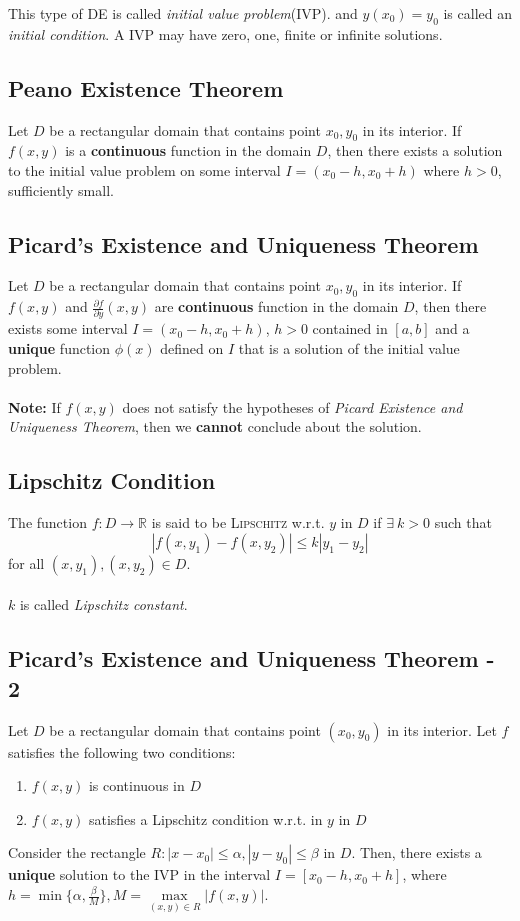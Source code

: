 \documentclass[oneside]{book}
\begin{document}
\noindent This type of DE is called \textit{initial value problem}(IVP). and \(y(x_0) = y_0\) is called an \textit{initial condition}.
A IVP may have zero, one, finite or infinite solutions.

\subsection{Peano Existence Theorem}
\noindent Let \(D\) be a rectangular domain that contains point \(x_0, y_0\) in its interior. If \(f(x, y)\) is a \textbf{continuous} function in the domain \(D\), then there exists a solution to the initial value problem on some interval \(I = (x_0 - h, x_0 + h)\) where \(h>0\), sufficiently small.

\subsection{Picard's Existence and Uniqueness Theorem}
\noindent Let \(D\) be a rectangular domain that contains point \(x_0, y_0\) in its interior. If \(f(x, y)\) and \(\frac{\partial f}{\partial y}(x, y)\) are \textbf{continuous} function in the domain \(D\), then there exists some interval \(I = (x_0 - h, x_0 + h)\), \(h>0\) contained in \([a, b]\) and a \textbf{unique} function \(\phi(x)\) defined on \(I\) that is a solution of the initial value problem.
\\\\
\noindent\textbf{Note:} If \(f(x, y)\) does not satisfy the hypotheses of \textit{Picard Existence and Uniqueness Theorem}, then we \textbf{cannot} conclude about the solution.

\subsection{Lipschitz Condition}
\noindent The function \(f: D\to\mathbb{R}\) is said to be \textsc{Lipschitz} w.r.t. \(y\) in \(D\) if \(\exists\ k>0\) such that
\[
	|f(x, y_1) - f(x, y_2)| \leq k|y_1 - y_2|
\]
for all \((x, y_1), (x, y_2) \in D\).
\\\\
\noindent \(k\) is called \textit{Lipschitz constant}.

\subsection{Picard's Existence and Uniqueness Theorem - 2}
Let \(D\) be a rectangular domain that contains point \((x_0, y_0)\) in its interior. Let \(f\) satisfies the following two conditions:
\begin{enumerate}
	\item \(f(x, y)\) is continuous in \(D\)
	\item \(f(x, y)\) satisfies a Lipschitz condition w.r.t. in \(y\) in \(D\)
\end{enumerate}
Consider the rectangle \(R: |x - x_0| \leq \alpha, |y- y_0|\leq \beta\) in \(D\). Then, there exists a \textbf{unique} solution to the IVP in the interval \(I = [x_0 - h, x_0 + h]\), where \(h = \min\{\alpha, \frac{\beta}{M}\}, M = \max\limits_{(x, y)\in{R}}|f(x, y)|\).
\end{document}
